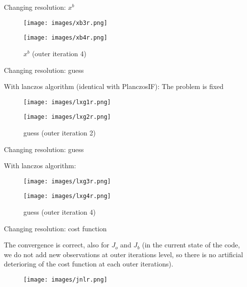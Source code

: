 \documentclass[francais]{beamer}
\begin{document}
\begin{frame}{Changing resolution: $x^b$}
\begin{center}
\begin{figure}
  \texttt{[image: images/xb3r.png]}
  \caption{$x^b$ (outer iteration 3)}
\endminipage \hfill
{}%
  \texttt{[image: images/xb4r.png]}
  \caption{$x^b$ (outer iteration 4)}
\endminipage
\end{figure}
\end{center}
\end{frame}


\begin{frame}{Changing resolution: guess}
\begin{center}
With lanczos algorithm (identical with PlanczosIF): The problem is fixed
\begin{figure}
  \texttt{[image: images/lxg1r.png]}
  \caption{guess (outer iteration 1)}
\endminipage\hfill
{}
  \texttt{[image: images/lxg2r.png]}
  \caption{guess (outer iteration 2)}
\endminipage
\end{figure}
\end{center}
\end{frame}

\begin{frame}{Changing resolution: guess}
\begin{center}
With lanczos algorithm:
\begin{figure}
  \texttt{[image: images/lxg3r.png]}
  \caption{guess (outer iteration 3)}
\endminipage \hfill
{}%
  \texttt{[image: images/lxg4r.png]}
  \caption{guess (outer iteration 4)}
\endminipage
\end{figure}
\end{center}
\end{frame}


\begin{frame}{Changing resolution: cost function}
\begin{center}
The convergence is correct, also for $J_o$ and $J_b$ (in the current state of the code, we do not add new observations at outer iterations level, so there is no artificial deterioring of the cost function at each outer iterations).\\
\endminipage \hfill
{}%
\begin{figure}
  \texttt{[image: images/jnlr.png]}
\end{figure}
\endminipage
\end{center}
\end{frame}
\end{document}
